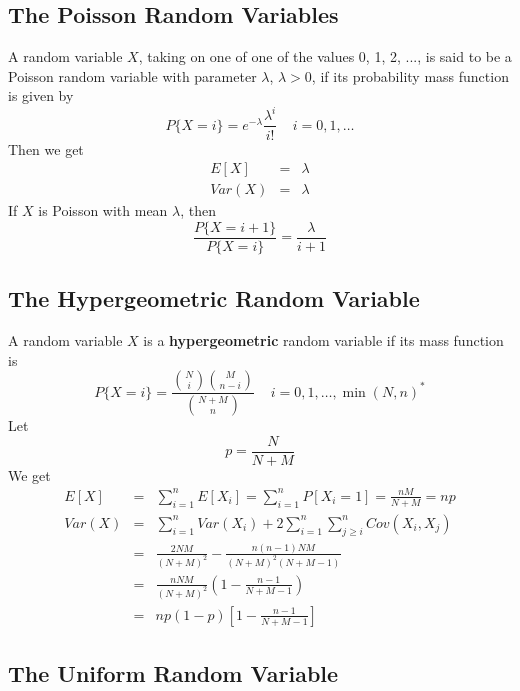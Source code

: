 \documentclass[12pt]{article}
\begin{document}
\subsection{The Poisson Random Variables}

A random variable $X$, taking on one of one of the values 0, 1, 2, ..., is said to be a Poisson random variable with parameter $\lambda$, $\lambda>0$, if its probability mass function is given by
\begin{equation*}
  P\{ X=i \} = e^{-\lambda} \frac{\lambda^i}{i!} \;\;\;\; i = 0,1,\dots
\end{equation*}
Then we get
\begin{eqnarray*}
  E[X] &=& \lambda \\
  Var(X) &=& \lambda
\end{eqnarray*}
If $X$ is Poisson with mean $\lambda$, then
\begin{equation*}
  \frac {P\{X=i+1\}}{P\{X=i\}}
  = \frac {\lambda}{i+1}
\end{equation*}

\subsection{The Hypergeometric Random Variable}

A random variable $X$ is a \textbf{hypergeometric} random variable if its mass function is
\begin{equation*}
  P\{ X = i \} = \frac
  {\binom{N}{i} \binom{M}{n-i}}
  {\binom{N+M}{n}} \;\;\;\; i = 0,1,\dots,\min(N,n)^*
\end{equation*}
Let
\begin{equation*}
  p = \frac {N}{N+M}
\end{equation*}
We get
\begin{eqnarray*}
  E[X] &=& \sum_{i=1}^n E[X_i] = \sum_{i=1}^n P[X_i=1] = \frac{nM}{N+M} = np \\
  Var(X) &=& \sum_{i=1}^n Var(X_i) + 
  2 \sum_{i=1}^n \sum_{j \ge i}^n Cov(X_i, X_j) \\
  &=& \frac{2NM}{(N+M)^2} - \frac{n(n-1)NM}{(N+M)^2(N+M-1)} \\
  &=& \frac{nNM}{(N+M)^2} \left( 1 - \frac{n-1}{N+M-1} \right) \\
  &=& np(1-p) \left[ 1 - \frac{n-1}{N+M-1} \right]
\end{eqnarray*}

\subsection{The Uniform Random Variable}
\end{document}
